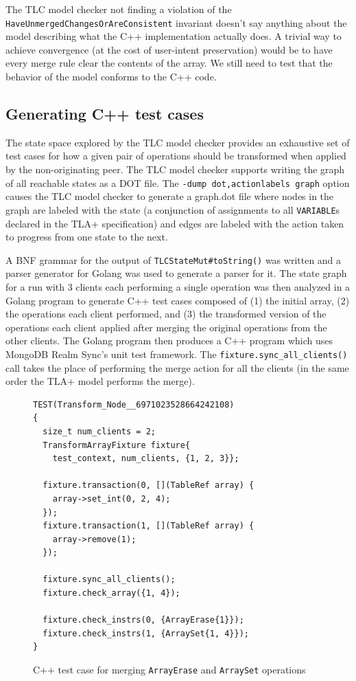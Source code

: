 \documentclass{vldb}
\begin{document}
The TLC model checker not finding a violation of the \texttt{HaveUnmergedChangesOrAreConsistent} invariant doesn't say anything about the model describing what the C++ implementation actually does. A trivial way to achieve convergence (at the cost of user-intent preservation) would be to have every merge rule clear the contents of the array. We still need to test that the behavior of the model conforms to the C++ code.

\subsection{Generating C++ test cases}
\label{subsec:mbtcg_cpp}

The state space explored by the TLC model checker provides an exhaustive set of test cases for how a given pair of operations should be transformed when applied by the non-originating peer. The TLC model checker supports writing the graph of all reachable states as a DOT file. The \texttt{-dump dot,actionlabels graph} option causes the TLC model checker to generate a graph.dot file where nodes in the graph are labeled with the state (a conjunction of assignments to all \texttt{VARIABLE}s declared in the TLA+ specification) and edges are labeled with the action taken to progress from one state to the next.

A BNF grammar for the output of \texttt{TLCStateMut\#toString()} was written and a parser generator for Golang was used \cite{GoccGitHub} to generate a parser for it. The state graph for a run with 3 clients each performing a single operation was then analyzed in a Golang program to generate C++ test cases composed of (1) the initial array, (2) the operations each client performed, and (3) the transformed version of the operations each client applied after merging the original operations from the other clients. The Golang program then produces a C++ program which uses MongoDB Realm Sync's unit test framework. The \texttt{fixture.sync\_all\_clients()} call takes the place of performing the merge action for all the clients (in the same order the TLA+ model performs the merge).

\begin{figure}
\begin{verbatim}
TEST(Transform_Node__6971023528664242108)
{
  size_t num_clients = 2;
  TransformArrayFixture fixture{
    test_context, num_clients, {1, 2, 3}};

  fixture.transaction(0, [](TableRef array) {
    array->set_int(0, 2, 4);
  });
  fixture.transaction(1, [](TableRef array) {
    array->remove(1);
  });

  fixture.sync_all_clients();
  fixture.check_array({1, 4});

  fixture.check_instrs(0, {ArrayErase{1}});
  fixture.check_instrs(1, {ArraySet{1, 4}});
}
\end{verbatim}
\caption{C++ test case for merging \texttt{ArrayErase} and \texttt{ArraySet} operations}
\label{fig:cpp_test_erase_set_merge}
\end{figure}
\end{document}
